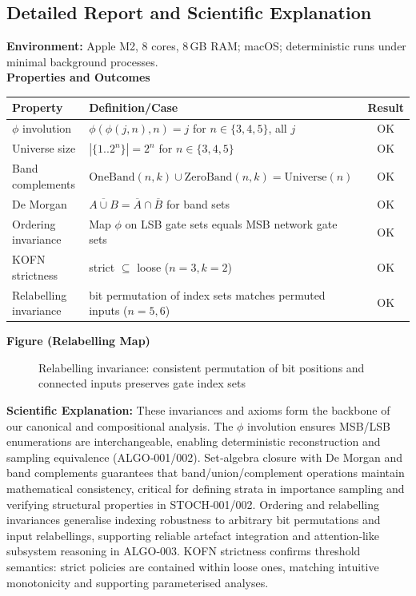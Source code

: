 \documentclass{article}
\begin{document}
\subsection*{Detailed Report and Scientific Explanation}
\textbf{Environment:} Apple M2, 8 cores, 8\,GB RAM; macOS; deterministic runs under minimal background processes.\\
\textbf{Properties and Outcomes}
\begin{center}
\begin{tabular}{llc}
\toprule
Property & Definition/Case & Result \\
\midrule
$\phi$ involution & $\phi(\phi(j,n),n)=j$ for $n\in\{3,4,5\}$, all $j$ & OK \\
Universe size & $|\{1..2^n\}|=2^n$ for $n\in\{3,4,5\}$ & OK \\
Band complements & $\mathrm{OneBand}(n,k)\cup\mathrm{ZeroBand}(n,k)=\mathrm{Universe}(n)$ & OK \\
De Morgan & $\overline{A\cup B}=\overline{A}\cap\overline{B}$ for band sets & OK \\
Ordering invariance & Map $\phi$ on LSB gate sets equals MSB network gate sets & OK \\
KOFN strictness & strict $\subseteq$ loose ($n=3, k=2$) & OK \\
Relabelling invariance & bit permutation of index sets matches permuted inputs ($n=5,6$) & OK \\
\bottomrule
\end{tabular}
\end{center}
\textbf{Figure (Relabelling Map)}
\begin{figure}[h]
\centering
{}
\caption{Relabelling invariance: consistent permutation of bit positions and connected inputs preserves gate index sets}
\end{figure}
\textbf{Scientific Explanation:} These invariances and axioms form the backbone of our canonical and compositional analysis. The $\phi$ involution ensures MSB/LSB enumerations are interchangeable, enabling deterministic reconstruction and sampling equivalence (ALGO‑001/002). Set‑algebra closure with De Morgan and band complements guarantees that band/union/complement operations maintain mathematical consistency, critical for defining strata in importance sampling and verifying structural properties in STOCH‑001/002. Ordering and relabelling invariances generalise indexing robustness to arbitrary bit permutations and input relabellings, supporting reliable artefact integration and attention‑like subsystem reasoning in ALGO‑003. KOFN strictness confirms threshold semantics: strict policies are contained within loose ones, matching intuitive monotonicity and supporting parameterised analyses.
\end{document}
